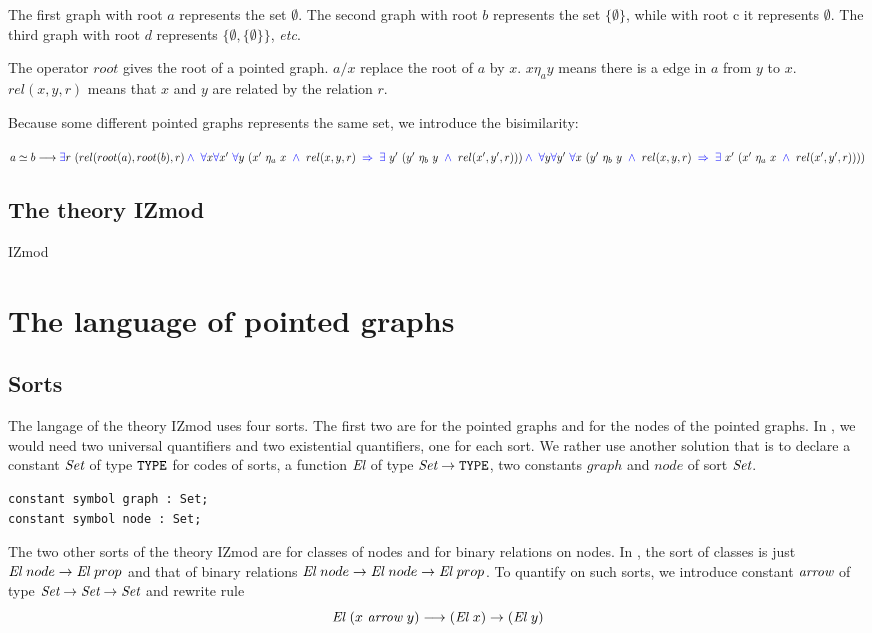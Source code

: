 \documentclass[a4paper]{article}
\begin{document}
The first graph with root $a$ represents the set $\emptyset$. The second graph with root $b$ represents the set $\{\emptyset\}$, while with root c it represents $\emptyset$. The third graph with root $d$ represents $\{\emptyset,\{\emptyset\}\}$, \textit{etc}.

The operator $root$ gives the root of a pointed graph. $a/x$ replace the root of $a$ by $x$. $x \eta_a y$ means there is a edge in $a$ from $y$ to $x$. $rel(x,y,r)$ means that $x$ and $y$ are related by the relation $r$.

Because some different pointed graphs represents the same set, we introduce the bisimilarity: 

$a \simeq b \longrightarrow {\color{blue} \exists} r~(rel(root(a),root(b),r) \\
\mathbin{\color{blue} \wedge} \ {\color{blue} \forall} x {\color{blue} \forall} x'~{\color{blue} \forall} y~(x'~\eta_a~x~\mathbin{\color{blue} \wedge}~rel(x, y, r)~\mathbin{\color{blue} \Rightarrow}~{\color{blue} \exists}~y'~(y'~\eta_b~y~\mathbin{\color{blue} \wedge}~rel(x', y', r))) \\
\mathbin{\color{blue} \wedge} \ {\color{blue} \forall} y {\color{blue} \forall} y'~{\color{blue} \forall} x~(y'~\eta_b~y~\mathbin{\color{blue} \wedge}~rel(x, y, r)~\mathbin{\color{blue} \Rightarrow}~{\color{blue} \exists}~x'~(x'~\eta_a~x~\mathbin{\color{blue} \wedge}~rel(x', y', r))))$

\subsection{The theory IZmod}

IZmod


\section{The language of pointed graphs}

\subsection{Sorts}

The langage of the theory IZmod uses four sorts. The first two are for
the pointed graphs and for the nodes of the pointed graphs.  In
\dedukti, we would need two universal quantifiers and two
existential quantifiers, one for each sort.  We rather use another
solution \cite{theoryU} that is to declare a constant $\mbox{\it Set}$ of type
$\mbox{\tt TYPE}$ for codes of sorts, a function ${\mbox{\it El}}$ of type $\mbox{\it Set} \rightarrow \mbox{\tt TYPE}$,
two constants $graph$ and $node$ of sort $\mbox{\it Set}$.

\begin{lstlisting}
constant symbol graph : Set;
constant symbol node : Set;
\end{lstlisting}

The two other sorts of the theory IZmod are for classes of nodes and
for binary relations on nodes.  In \dedukti, the sort of classes is
just ${\mbox{\it El}}~node \rightarrow {\mbox{\it El}}~prop$ and that of binary relations
${\mbox{\it El}}~node \rightarrow {\mbox{\it El}}~node \rightarrow {\mbox{\it El}}~prop$. To quantify on such sorts, we introduce constant ${\mbox{\it arrow}} $ of type
$\mbox{\it Set} \rightarrow \mbox{\it Set} \rightarrow \mbox{\it Set}$ and rewrite rule
$${\mbox{\it El}}~(x~{\mbox{\it arrow}}~y) \longrightarrow ({\mbox{\it El}}~x) \rightarrow ({\mbox{\it El}}~y)$$
\end{document}
